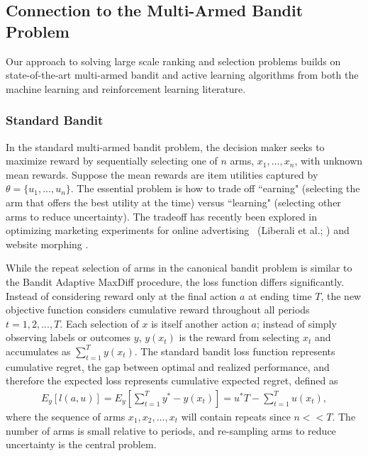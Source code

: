 \documentclass[a4paper,11pt]{article}
\begin{document}



\subsection{Connection to the Multi-Armed Bandit Problem}
Our approach to solving large scale ranking and selection problems builds on state-of-the-art multi-armed bandit and active learning algorithms from both the machine learning and reinforcement learning literature.

\subsubsection{Standard Bandit}

In the standard multi-armed bandit problem, the decision maker seeks to maximize reward by sequentially selecting one of $n$ arms, $x_1,\ldots,x_n$, with unknown mean rewards. Suppose the mean rewards are item utilities captured by $\theta = \{u_1, \ldots, u_n\}$. The essential problem is how to trade off ``earning" (selecting the arm that offers the best utility at the time) versus ``learning" (selecting other arms to reduce uncertainty). The tradeoff has recently been explored in optimizing marketing experiments for online advertising ~(Liberali et al.; \cite{schwartzetal2017,urban2013morphing}) and website morphing \citep{hauser2009website}. 

While the repeat selection of arms in the canonical bandit problem is similar to the Bandit Adaptive MaxDiff procedure, the loss function differs significantly. Instead of considering reward only at the final action $a$ at ending time $T$, the new objective function considers cumulative reward throughout all periods $t=1,2,...,T$. Each selection of $x$ is itself another action $a$; instead of simply observing labels or outcomes $y$, $y(x_t)$ is the reward from selecting $x_t$ and accumulates as $\sum_{t=1}^{T} y(x_t)$. The standard bandit loss function represents cumulative regret, the gap between optimal and realized performance, and therefore the expected loss represents cumulative expected regret, defined as
\begin{align}
E_y[ l(a,u) ] = E_y[ \sum_{t=1}^{T} y^{*} - y(x_t) ] 
= u^{*}T - \sum_{t=1}^{T} u(x_t), 
\end{align}
where the sequence of arms $x_1,x_2,\ldots,x_t$ will contain repeats since $n << T$. The number of arms is small relative to periods, and re-sampling arms to reduce uncertainty is the central problem. 
\end{document}

